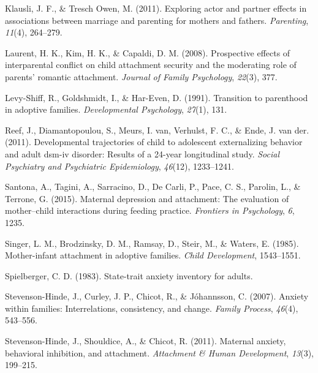 \documentclass[man]{apa6}
\begin{document}
\leavevmode\hypertarget{ref-klausli2011exploring}{}%
Klausli, J. F., \& Tresch Owen, M. (2011). Exploring actor and partner effects in associations between marriage and parenting for mothers and fathers. \emph{Parenting}, \emph{11}(4), 264--279.

\leavevmode\hypertarget{ref-laurent2008prospective}{}%
Laurent, H. K., Kim, H. K., \& Capaldi, D. M. (2008). Prospective effects of interparental conflict on child attachment security and the moderating role of parents' romantic attachment. \emph{Journal of Family Psychology}, \emph{22}(3), 377.

\leavevmode\hypertarget{ref-levy1991transition}{}%
Levy-Shiff, R., Goldshmidt, I., \& Har-Even, D. (1991). Transition to parenthood in adoptive families. \emph{Developmental Psychology}, \emph{27}(1), 131.

\leavevmode\hypertarget{ref-reef2011developmental}{}%
Reef, J., Diamantopoulou, S., Meurs, I. van, Verhulst, F. C., \& Ende, J. van der. (2011). Developmental trajectories of child to adolescent externalizing behavior and adult dsm-iv disorder: Results of a 24-year longitudinal study. \emph{Social Psychiatry and Psychiatric Epidemiology}, \emph{46}(12), 1233--1241.

\leavevmode\hypertarget{ref-santona2015maternal}{}%
Santona, A., Tagini, A., Sarracino, D., De Carli, P., Pace, C. S., Parolin, L., \& Terrone, G. (2015). Maternal depression and attachment: The evaluation of mother--child interactions during feeding practice. \emph{Frontiers in Psychology}, \emph{6}, 1235.

\leavevmode\hypertarget{ref-singer1985mother}{}%
Singer, L. M., Brodzinsky, D. M., Ramsay, D., Steir, M., \& Waters, E. (1985). Mother-infant attachment in adoptive families. \emph{Child Development}, 1543--1551.

\leavevmode\hypertarget{ref-spielberger1983state}{}%
Spielberger, C. D. (1983). State-trait anxiety inventory for adults.

\leavevmode\hypertarget{ref-stevenson2007anxiety}{}%
Stevenson-Hinde, J., Curley, J. P., Chicot, R., \& Jóhannsson, C. (2007). Anxiety within families: Interrelations, consistency, and change. \emph{Family Process}, \emph{46}(4), 543--556.

\leavevmode\hypertarget{ref-stevenson2011maternal}{}%
Stevenson-Hinde, J., Shouldice, A., \& Chicot, R. (2011). Maternal anxiety, behavioral inhibition, and attachment. \emph{Attachment \& Human Development}, \emph{13}(3), 199--215.
\end{document}
